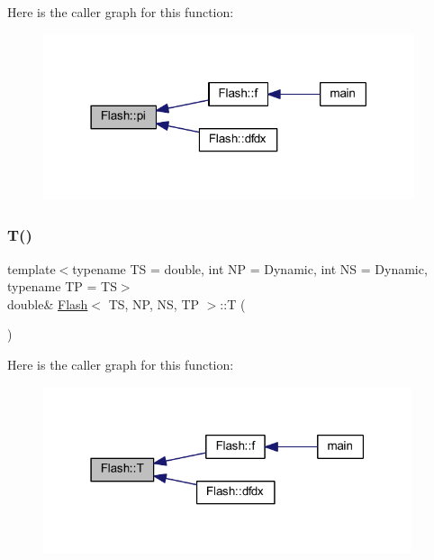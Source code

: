 Here is the caller graph for this function\+:
\nopagebreak
\begin{figure}[H]
\begin{center}
\leavevmode
\includegraphics[width=309pt]{class_flash_ae54dbc3d5d7b87c854a765e9b5f4e519_icgraph}
\end{center}
\end{figure}
\mbox{\label{class_flash_af0f7e7c438368d98a6ea330d40b39cd3}} 
\subsubsection{\texorpdfstring{T()}{T()}}
{\footnotesize\ttfamily template$<$typename TS = double, int NP = Dynamic, int NS = Dynamic, typename TP = TS$>$ \\
double\& \mbox{\hyperlink{class_flash}{Flash}}$<$ TS, NP, NS, TP $>$\+::T (\begin{DoxyParamCaption}{ }\end{DoxyParamCaption})\hspace{0.3cm}{\ttfamily [inline]}}

Here is the caller graph for this function\+:
\nopagebreak
\begin{figure}[H]
\begin{center}
\leavevmode
\includegraphics[width=307pt]{class_flash_af0f7e7c438368d98a6ea330d40b39cd3_icgraph}
\end{center}
\end{figure}
\mbox{\label{class_flash_aa4358ff3c66c1c461a2dba41436b95fe}} 
